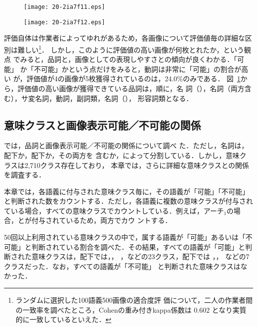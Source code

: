 \documentclass[japanese]{jnlp_1.4}
\newcommand{\izs}[1]{}
\newcommand{\refsec}[1]{}
\begin{document}
\begin{figure}[b]
\begin{minipage}[t]{188pt}
\setlength{\captionwidth}{186pt}
\texttt{[image: 20-2ia7f11.eps]}
\label{fig:pos-cannot}
\end{minipage}
\hfill
\begin{minipage}[t]{184pt}
\setlength{\captionwidth}{182pt}
\texttt{[image: 20-2ia7f12.eps]}
\label{fig:eva4-5}
\end{minipage}
\vspace{-0.5\Cvs}
\end{figure}

評価自体は作業者によってゆれがあるため，各画像について評価値毎の詳細な区
別は難しい\footnote{ランダムに選択した100語義500画像の適合度評
価について，二人の作業者間の一致率を調べたところ，Cohenの重み付きkappa係数は
0.602 となり実質的に一致しているといえた．}．
しかし，このように評価値の高い画像が何枚とれたか，という観点
でみると，品詞と，画像としての表現しやすさとの傾向が良くわかる．「可能」
か「不可能」かという点だけをみると，動詞は非常に「可能」の割合が高い
が，評価値が4の画像が5枚獲得されているのは，24.0\%のみである．
図~\ref{fig:eva4-5}から，評価値の高い画像が獲得できている品詞は，順に，名
詞（\izs{2:具体}），名詞（両方含む），サ変名詞，動詞，副詞類，名詞（\izs{1000:抽象}），
形容詞類となる．


\subsection{意味クラスと画像表示可能／不可能の関係} \label{sec:iz-cannot}

\refsec{sec:pos-cannot}では，品詞と画像表示可能／不可能の関係について調べ
た．ただし，名詞は，\izs{2:具体}配下か，\izs{1000:抽象}配下か，その両方を
含むか，によって分割している．しかし，意味クラスは2,710クラス存在しており，
本章では，さらに詳細な意味クラスとの関係を調査する．

本章では，各語義に付与された意味クラス毎に，その語義が「可能」「不可能」
と判断された数をカウントする．ただし，各語義に複数の意味クラスが付与され
ている場合，すべての意味クラスでカウントしている．例えば，アーチ$_1$の場
合，\izs{865:家屋（本体）}と\izs{2435:類型}が付与されているため，両方でカウ
ントする．

50回以上利用されている意味クラスの中で，属する語義が「可能」あるいは「不
可能」と判断されている割合を調べた．その結果，すべての語義が「可能」と判
断された意味クラスは，\izs{2:具体}配下では，\izs{677:作物}，
\izs{818:衣服（本体）}，\izs{920:出版物}などの23クラス，\izs{1000:抽象}配下では
\izs{1048:絵画}，\izs{2360:天気}，\izs{2498:構造} 
などの7クラスだった．なお，すべての語義が「不可能」
と判断された意味クラスはなかった．
\end{document}
